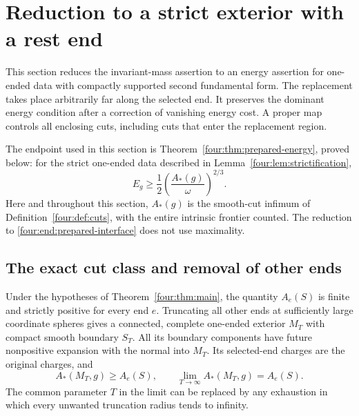 \section{Reduction to a strict exterior with a rest end}\label{four:sec:end}

This section reduces the invariant-mass assertion to an energy assertion
for one-ended data with compactly supported second fundamental form.
The replacement takes place arbitrarily far along the selected end.
It preserves the dominant energy condition after a correction of
vanishing energy cost. A proper map controls all enclosing cuts, including
cuts that enter the replacement region.

The endpoint used in this section is Theorem~\ref{four:thm:prepared-energy},
proved below: for the strict one-ended data described in
Lemma~\ref{four:lem:strictification},
\begin{equation}\label{four:end:prepared-interface}
 E_g\ge \frac12\left(\frac{A_*(g)}{\omega}\right)^{2/3}.
\end{equation}
Here and throughout this section, \(A_*(g)\) is the smooth-cut infimum
of Definition~\ref{four:def:cuts}, with the entire intrinsic frontier counted.
The reduction to \eqref{four:end:prepared-interface} does not use maximality.

\subsection{The exact cut class and removal of other ends}

\begin{lemma}\label{four:lem:cut-reduction}
Under the hypotheses of Theorem~\ref{four:thm:main}, the quantity \(A_e(S)\)
is finite and strictly positive for every end \(e\).
Truncating all other ends at sufficiently large coordinate spheres gives
a connected, complete one-ended exterior \(M_T\) with compact smooth
boundary \(S_T\). All its boundary components have future nonpositive
expansion with the normal into \(M_T\). Its selected-end charges are the
original charges, and
\begin{equation}\label{four:end:cut-truncation}
 A_*(M_T,g)\ge A_e(S),\qquad
 \lim_{T\to\infty}A_*(M_T,g)=A_e(S).
\end{equation}
The common parameter \(T\) in the limit can be replaced by any exhaustion
in which every unwanted truncation radius tends to infinity.
\end{lemma}


